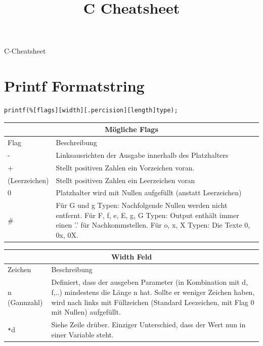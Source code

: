 \documentclass[a4paper,10pt]{article}
\title{C Cheatsheet}
\author{}
\date{}
\begin{document}
{\LARGE C-Cheatsheet}

\section{Printf Formatstring}

\begin{lstlisting}
printf(%[flags][width][.percision][length]type);
\end{lstlisting} 

\begin{center}
    \begin{tabularx}{\textwidth}{|l|X|}
        \hline
        \multicolumn{2}{|c|}{Mögliche Flags} \\
        \hline
            Flag   & Beschreibung\\
        \hline
            -               & Linksausrichten der Ausgabe innerhalb des Platzhalters\\
            +               & Stellt positiven Zahlen ein Vorzeichen voran.\\
            (Leerzeichen)   & Stellt positiven Zahlen ein Leerzeichen voran\\
            0               & Platzhalter wird mit Nullen aufgefüllt (anstatt Leerzeichen)\\
            \#              & Für G und g Typen: Nachfolgende Nullen werden nicht
                            entfernt.
                            Für F, f, e, E, g, G Typen: Output enthält immer einen '.' für Nachkommstellen.
                            Für o, x, X Typen: Die Texte 0, 0x, 0X.\\ 
        \hline
    \end{tabularx}
\end{center}
\begin{center}
    \begin{tabularx}{\textwidth}{|l|X|}
        \hline
        \multicolumn{2}{|c|}{Width Feld} \\
        \hline
            Zeichen   & Beschreibung\\
        \hline
            n (Gannzahl)    & Definiert, dass der ausgeben Parameter (in
                            Kombination  mit d, f,..) mindestens die Länge n hat. Sollte er  weniger Zeichen haben, wird nach links mit Füllzeichen (Standard Leezeichen, mit Flag 0 mit Nullen) aufgefüllt.\\ 
            \verb|*|d       & Siehe Zeile drüber. Einziger Unterschied, dass der
                            Wert nun in einer Variable steht.\\ 
        \hline
    \end{tabularx}
\end{center}
\end{document}
